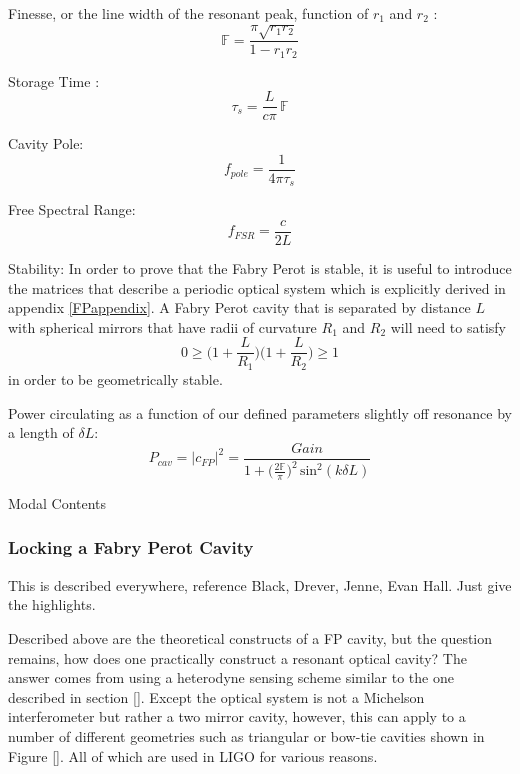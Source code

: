 		Finesse, or the line width of the resonant peak, function of $r_1$ and $r_2$      :
		\begin{equation}
		\mathbb{F} = \frac{\pi \sqrt{r_1 r_2}}{1- r_1 r_2}
		\end{equation}
		
		Storage Time :
		\begin{equation}
		\tau_{s} = \frac{L}{c \pi} \, \mathbb{F}
		\end{equation}
		
		Cavity Pole:
		\begin{equation}
		f_{pole} = \frac{1}{4\pi \tau_{s}}
		\end{equation}
	
		Free Spectral Range:
		\begin{equation}
		f_{FSR}  = \frac{c}{2L}
		\end{equation}
		
		Stability: In order to prove that the Fabry Perot is stable, it is useful to introduce the matrices that describe a periodic optical system which is explicitly derived in appendix \ref{FPappendix}.  A Fabry Perot cavity that is separated by distance $L$ with spherical mirrors that have radii of curvature $R_1$ and $R_2$ will need to satisfy 
		\begin{equation}\label{gfactor}
		0 \geq \bigg(1+\frac{L}{R_1}\bigg) \bigg(1+\frac{L}{R_2}\bigg) \geq 1
		\end{equation}
		in order to be geometrically stable.
		
		Power circulating as a function of our defined parameters slightly off resonance by a length of $\delta L$:
		\begin{equation}
		P_{cav} = \vert c_{FP} \vert^2 = \frac{Gain}{ 1 + \big(\frac{2\mathbb{F}}{\pi} \big)^2 \, \text{sin}^2(k \delta L) }
		\end{equation}
		
		Modal Contents
		
		\subsubsection{Locking a Fabry Perot Cavity}
		This is described everywhere, reference Black, Drever, Jenne, Evan Hall. Just give the highlights.
		
		Described above are the theoretical constructs of a FP cavity, but the question remains, how does one practically construct a resonant optical cavity?  The answer comes from using a heterodyne sensing scheme similar to the one described in section [].  Except the optical system is not a Michelson interferometer but rather a two mirror cavity, however, this can apply to a number of different geometries such as triangular or bow-tie cavities shown in Figure [].  All of which are used in LIGO for various reasons.
		
